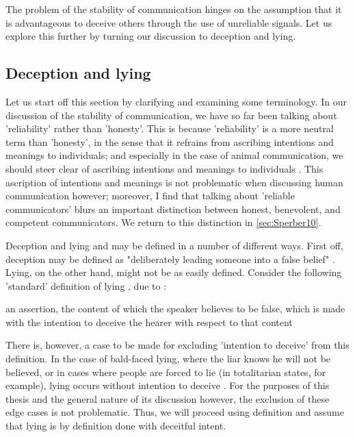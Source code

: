 The problem of the stability of communication hinges on the assumption that it is advantageous to deceive others through the use of unreliable signals. Let us explore this further by turning our discussion to deception and lying.

\subsection{Deception and lying}
\label{sec:deception}

Let us start off this section by clarifying and examining some terminology.
In our discussion of the stability of communication, we have so far been talking about 'reliability' rather than 'honesty'. This is because 'reliability' is a more neutral term than 'honesty', in the sense that it refrains from ascribing intentions and meanings to individuals; and especially in the case of animal communication, we should steer clear of ascribing intentions and meanings to individuals \citep{Scott-Phillips08}.
This ascription of intentions and meanings is not problematic when discussing human communication however; moreover, I find that talking about 'reliable communicators' blurs an important distinction between honest, benevolent, and competent communicators. We return to this distinction in \cref{sec:Sperber10}.

Deception and lying and may be defined in a number of different ways.
First off, deception may be defined as "deliberately leading someone into a false belief" \citep[p.~358]{Meibauer18}.
Lying, on the other hand, might not be as easily defined. Consider the following 'standard' definition of lying \citep{Meibauer18}, due to \citet{Williams02}:
\begin{quoting}
    an assertion, the content of which the speaker believes to be false, which is made with the intention to deceive the hearer with respect to that content
    \hfill \citep[p.~96]{Williams02}
\end{quoting}
There is, however, a case to be made for excluding 'intention to deceive' from this definition. In the case of bald-faced lying, where the liar knows he will not be believed, or in cases where people are forced to lie (in totalitarian states, for example), lying occurs without intention to deceive \citep[\S 1.5]{Saul12}.
For the purposes of this thesis and the general nature of its discussion however, the exclusion of these edge cases is not problematic. Thus, we will proceed using  definition and assume that lying is by definition done with deceitful intent.

